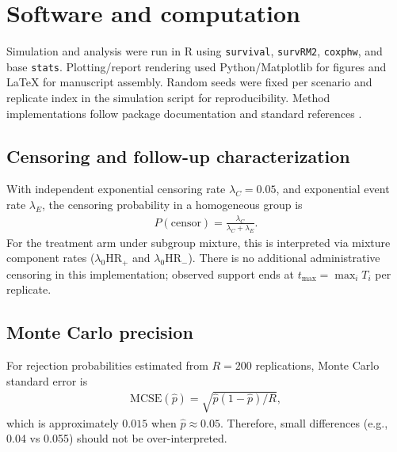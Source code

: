 \documentclass[11pt]{article}
\begin{document}
\section{Software and computation}
Simulation and analysis were run in R using \texttt{survival}, \texttt{survRM2}, \texttt{coxphw}, and base \texttt{stats}. Plotting/report rendering used Python/Matplotlib for figures and LaTeX for manuscript assembly. Random seeds were fixed per scenario and replicate index in the simulation script for reproducibility. Method implementations follow package documentation and standard references \citep{cox1972,harrington1982,uno2014,schemper2009}.

\subsection{Censoring and follow-up characterization}
With independent exponential censoring rate $\lambda_C=0.05$, and exponential event rate $\lambda_E$, the censoring probability in a homogeneous group is
\begin{align}
P(\text{censor})=\frac{\lambda_C}{\lambda_C+\lambda_E}.
\end{align}
For the treatment arm under subgroup mixture, this is interpreted via mixture component rates ($\lambda_0\mathrm{HR}_{+}$ and $\lambda_0\mathrm{HR}_{-}$). There is no additional administrative censoring in this implementation; observed support ends at $t_{\max}=\max_i T_i$ per replicate.

\subsection{Monte Carlo precision}
For rejection probabilities estimated from $R=200$ replications, Monte Carlo standard error is
\begin{align}
\mathrm{MCSE}(\hat p)=\sqrt{\hat p(1-\hat p)/R},
\end{align}
which is approximately $0.015$ when $\hat p\approx0.05$. Therefore, small differences (e.g., 0.04 vs 0.055) should not be over-interpreted.
\end{document}
